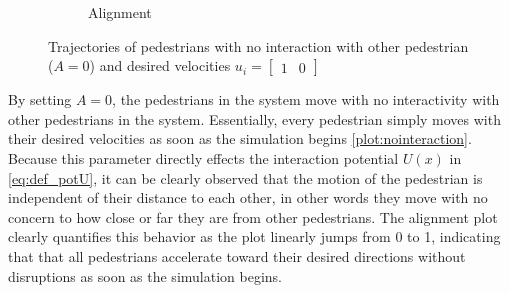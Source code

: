\begin{itemize}
\begin{figure}[H]
\begin{subfigure}{.49\textwidth}
        \caption{Alignment}
        \label{plot:nointeraction_alignemnt}
    \end{subfigure}
    \caption{Trajectories of pedestrians with no interaction with other pedestrian ($ A = 0 $) and desired velocities $u_i = \begin{bmatrix}1 & 0\end{bmatrix} $}
    \label{plot:nointeraction}
\end{figure}

By setting $A = 0$, the pedestrians in the system move with no interactivity with other pedestrians in the system. Essentially, every pedestrian simply moves with their desired velocities as soon as the simulation begins \autoref{plot:nointeraction}. Because this parameter directly effects the interaction potential $U(x)$ in \autoref{eq:def_potU}, it can be clearly observed that the motion of the pedestrian is independent of their distance to each other, in other words they move with no concern to how close or far they are from other pedestrians. The alignment plot clearly quantifies this behavior as the plot linearly jumps from 0 to 1, indicating that that all pedestrians accelerate toward their desired directions without disruptions as soon as the simulation begins.



\end{itemize}
